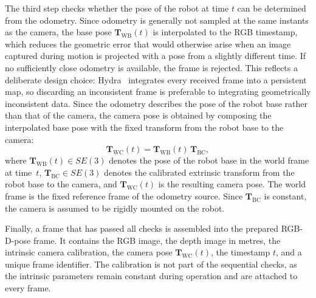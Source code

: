 {\small The third step checks whether the pose of the robot at time $t$ can be determined from the odometry. Since odometry is generally not sampled at the same instants as the camera, the base pose $\mathbf{T}_{\mathrm{WB}}(t)$ is interpolated to the RGB timestamp, which reduces the geometric error that would otherwise arise when an image captured during motion is projected with a pose from a slightly different time. If no sufficiently close odometry is available, the frame is rejected. This reflects a deliberate design choice: Hydra~\cite{hughes2022hydra} integrates every received frame into a persistent map, so discarding an inconsistent frame is preferable to integrating geometrically inconsistent data. Since the odometry describes the pose of the robot base rather than that of the camera, the camera pose is obtained by composing the interpolated base pose with the fixed transform from the robot base to the camera:
\begin{equation}
  \mathbf{T}_{\mathrm{WC}}(t) = \mathbf{T}_{\mathrm{WB}}(t)\,\mathbf{T}_{\mathrm{BC}},
  \label{eq:camera_pose}
\end{equation}
where $\mathbf{T}_{\mathrm{WB}}(t) \in SE(3)$ denotes the pose of the robot base in the world frame at time~$t$, $\mathbf{T}_{\mathrm{BC}} \in SE(3)$ denotes the calibrated extrinsic transform from the robot base to the camera, and $\mathbf{T}_{\mathrm{WC}}(t)$ is the resulting camera pose. The world frame is the fixed reference frame of the odometry source. Since $\mathbf{T}_{\mathrm{BC}}$ is constant, the camera is assumed to be rigidly mounted on the robot.\par}

{\small Finally, a frame that has passed all checks is assembled into the prepared RGB-D-pose frame. It contains the RGB image, the depth image in metres, the intrinsic camera calibration, the camera pose $\mathbf{T}_{\mathrm{WC}}(t)$, the timestamp $t$, and a unique frame identifier. The calibration is not part of the sequential checks, as the intrinsic parameters remain constant during operation and are attached to every frame.\par}

